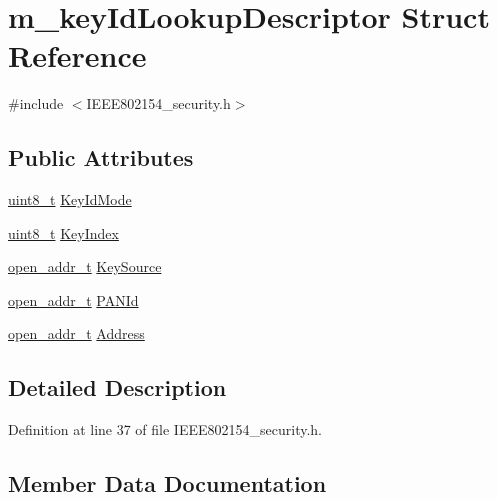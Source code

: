 \hypertarget{structm__key_id_lookup_descriptor}{}\section{m\+\_\+key\+Id\+Lookup\+Descriptor Struct Reference}
\label{structm__key_id_lookup_descriptor}


{\ttfamily \#include $<$I\+E\+E\+E802154\+\_\+security.\+h$>$}

\subsection*{Public Attributes}
\begin{DoxyCompactItemize}
\item 
\hyperlink{_p_e___types_8h_aba7bc1797add20fe3efdf37ced1182c5}{uint8\+\_\+t} \hyperlink{structm__key_id_lookup_descriptor_a9c4b7d9a28becd4859377cee2911a291}{Key\+Id\+Mode}
\item 
\hyperlink{_p_e___types_8h_aba7bc1797add20fe3efdf37ced1182c5}{uint8\+\_\+t} \hyperlink{structm__key_id_lookup_descriptor_a8a5d67e0072bc8a4a3f568ffb17d8877}{Key\+Index}
\item 
\hyperlink{structopen__addr__t}{open\+\_\+addr\+\_\+t} \hyperlink{structm__key_id_lookup_descriptor_a0ef7f0cc5cb3e4121ac6dcc37715e345}{Key\+Source}
\item 
\hyperlink{structopen__addr__t}{open\+\_\+addr\+\_\+t} \hyperlink{structm__key_id_lookup_descriptor_a0de84585a2981ce7dfe61ca5618d382b}{P\+A\+N\+Id}
\item 
\hyperlink{structopen__addr__t}{open\+\_\+addr\+\_\+t} \hyperlink{structm__key_id_lookup_descriptor_aaf0e723963972277023c645a1e55197a}{Address}
\end{DoxyCompactItemize}


\subsection{Detailed Description}


Definition at line 37 of file I\+E\+E\+E802154\+\_\+security.\+h.



\subsection{Member Data Documentation}
